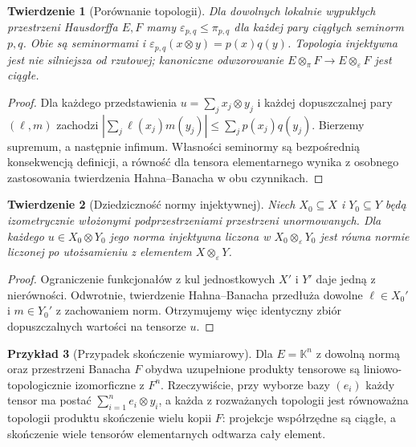 \documentclass[11pt,a4paper]{article}
\numberwithin{equation}{section}
\theoremstyle{plain}
\newtheorem{twierdzenie}{Twierdzenie}[section]
\theoremstyle{definition}
\newtheorem{przyklad}[twierdzenie]{Przykład}
\theoremstyle{remark}
\newcommand{\K}{\mathbb K}
\begin{document}
\begin{twierdzenie}[Porównanie topologii]
\label{thm:eps-pi24}
Dla dowolnych lokalnie wypukłych przestrzeni Hausdorffa
$E,F$ mamy $\varepsilon_{p,q}\le\pi_{p,q}$ dla każdej
pary ciągłych seminorm $p,q$. Obie są seminormami i
$\varepsilon_{p,q}(x\otimes y)=p(x)q(y)$.
Topologia injektywna jest nie silniejsza od rzutowej;
kanoniczne odwzorowanie
$E\otimes_\pi F\to E\otimes_\varepsilon F$ jest ciągłe.
\end{twierdzenie}
\begin{proof}
Dla każdego przedstawienia $u=\sum_jx_j\otimes y_j$
i każdej dopuszczalnej pary $(\ell,m)$ zachodzi
$|\sum_j\ell(x_j)m(y_j)|\le\sum_jp(x_j)q(y_j)$.
Bierzemy supremum, a następnie infimum. Własności
seminormy są bezpośrednią konsekwencją definicji,
a równość dla tensora elementarnego wynika z osobnego
zastosowania twierdzenia Hahna--Banacha w obu czynnikach.
\end{proof}

\begin{twierdzenie}[Dziedziczność normy injektywnej]
\label{thm:eps-injective24}
Niech $X_0\subseteq X$ i $Y_0\subseteq Y$ będą izometrycznie
włożonymi podprzestrzeniami przestrzeni unormowanych.
Dla każdego $u\in X_0\otimes Y_0$ jego norma injektywna
liczona w $X_0\otimes_\varepsilon Y_0$ jest równa normie
liczonej po utożsamieniu z elementem $X\otimes_\varepsilon Y$.
\end{twierdzenie}
\begin{proof}
Ograniczenie funkcjonałów z kul jednostkowych $X'$ i $Y'$
daje jedną z nierówności. Odwrotnie, twierdzenie
Hahna--Banacha przedłuża dowolne $\ell\in X_0'$
i $m\in Y_0'$ z zachowaniem norm. Otrzymujemy więc
identyczny zbiór dopuszczalnych wartości na tensorze $u$.
\end{proof}

\begin{przyklad}[Przypadek skończenie wymiarowy]
\label{ex:finite-dim24}
Dla $E=\K^n$ z dowolną normą oraz przestrzeni Banacha $F$
obydwa uzupełnione produkty tensorowe są liniowo-topologicznie
izomorficzne z $F^n$. Rzeczywiście, przy wyborze bazy
$(e_i)$ każdy tensor ma postać $\sum_{i=1}^ne_i\otimes y_i$,
a każda z rozważanych topologii jest równoważna topologii
produktu skończenie wielu kopii $F$: projekcje współrzędne
są ciągłe, a skończenie wiele tensorów elementarnych
odtwarza cały element.
\end{przyklad}
\end{document}

